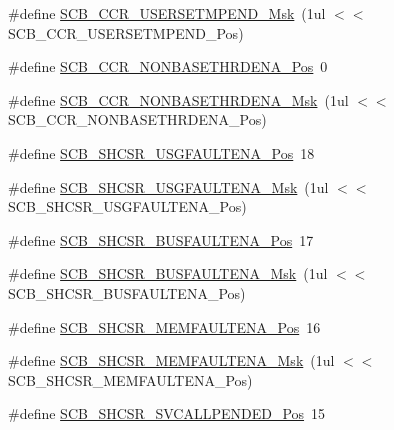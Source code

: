 \begin{DoxyCompactItemize}
\item 
\#define \mbox{\hyperlink{group___c_m_s_i_s___c_m3___s_c_b_ga4cf59b6343ca962c80e1885710da90aa}{S\+C\+B\+\_\+\+C\+C\+R\+\_\+\+U\+S\+E\+R\+S\+E\+T\+M\+P\+E\+N\+D\+\_\+\+Msk}}~(1ul $<$$<$ S\+C\+B\+\_\+\+C\+C\+R\+\_\+\+U\+S\+E\+R\+S\+E\+T\+M\+P\+E\+N\+D\+\_\+\+Pos)
\item 
\#define \mbox{\hyperlink{group___c_m_s_i_s___c_m3___s_c_b_gab4615f7deb07386350365b10240a3c83}{S\+C\+B\+\_\+\+C\+C\+R\+\_\+\+N\+O\+N\+B\+A\+S\+E\+T\+H\+R\+D\+E\+N\+A\+\_\+\+Pos}}~0
\item 
\#define \mbox{\hyperlink{group___c_m_s_i_s___c_m3___s_c_b_gafe0f6be81b35d72d0736a0a1e3b4fbb3}{S\+C\+B\+\_\+\+C\+C\+R\+\_\+\+N\+O\+N\+B\+A\+S\+E\+T\+H\+R\+D\+E\+N\+A\+\_\+\+Msk}}~(1ul $<$$<$ S\+C\+B\+\_\+\+C\+C\+R\+\_\+\+N\+O\+N\+B\+A\+S\+E\+T\+H\+R\+D\+E\+N\+A\+\_\+\+Pos)
\item 
\#define \mbox{\hyperlink{group___c_m_s_i_s___c_m3___s_c_b_gae71949507636fda388ec11d5c2d30b52}{S\+C\+B\+\_\+\+S\+H\+C\+S\+R\+\_\+\+U\+S\+G\+F\+A\+U\+L\+T\+E\+N\+A\+\_\+\+Pos}}~18
\item 
\#define \mbox{\hyperlink{group___c_m_s_i_s___c_m3___s_c_b_ga056fb6be590857bbc029bed48b21dd79}{S\+C\+B\+\_\+\+S\+H\+C\+S\+R\+\_\+\+U\+S\+G\+F\+A\+U\+L\+T\+E\+N\+A\+\_\+\+Msk}}~(1ul $<$$<$ S\+C\+B\+\_\+\+S\+H\+C\+S\+R\+\_\+\+U\+S\+G\+F\+A\+U\+L\+T\+E\+N\+A\+\_\+\+Pos)
\item 
\#define \mbox{\hyperlink{group___c_m_s_i_s___c_m3___s_c_b_ga3d32edbe4a5c0335f808cfc19ec7e844}{S\+C\+B\+\_\+\+S\+H\+C\+S\+R\+\_\+\+B\+U\+S\+F\+A\+U\+L\+T\+E\+N\+A\+\_\+\+Pos}}~17
\item 
\#define \mbox{\hyperlink{group___c_m_s_i_s___c_m3___s_c_b_ga43e8cbe619c9980e0d1aacc85d9b9e47}{S\+C\+B\+\_\+\+S\+H\+C\+S\+R\+\_\+\+B\+U\+S\+F\+A\+U\+L\+T\+E\+N\+A\+\_\+\+Msk}}~(1ul $<$$<$ S\+C\+B\+\_\+\+S\+H\+C\+S\+R\+\_\+\+B\+U\+S\+F\+A\+U\+L\+T\+E\+N\+A\+\_\+\+Pos)
\item 
\#define \mbox{\hyperlink{group___c_m_s_i_s___c_m3___s_c_b_ga685b4564a8760b4506f14ec4307b7251}{S\+C\+B\+\_\+\+S\+H\+C\+S\+R\+\_\+\+M\+E\+M\+F\+A\+U\+L\+T\+E\+N\+A\+\_\+\+Pos}}~16
\item 
\#define \mbox{\hyperlink{group___c_m_s_i_s___c_m3___s_c_b_gaf084424fa1f69bea36a1c44899d83d17}{S\+C\+B\+\_\+\+S\+H\+C\+S\+R\+\_\+\+M\+E\+M\+F\+A\+U\+L\+T\+E\+N\+A\+\_\+\+Msk}}~(1ul $<$$<$ S\+C\+B\+\_\+\+S\+H\+C\+S\+R\+\_\+\+M\+E\+M\+F\+A\+U\+L\+T\+E\+N\+A\+\_\+\+Pos)
\item 
\#define \mbox{\hyperlink{group___c_m_s_i_s___c_m3___s_c_b_ga2f93ec9b243f94cdd3e94b8f0bf43641}{S\+C\+B\+\_\+\+S\+H\+C\+S\+R\+\_\+\+S\+V\+C\+A\+L\+L\+P\+E\+N\+D\+E\+D\+\_\+\+Pos}}~15
$$
\end{DoxyCompactItemize}
